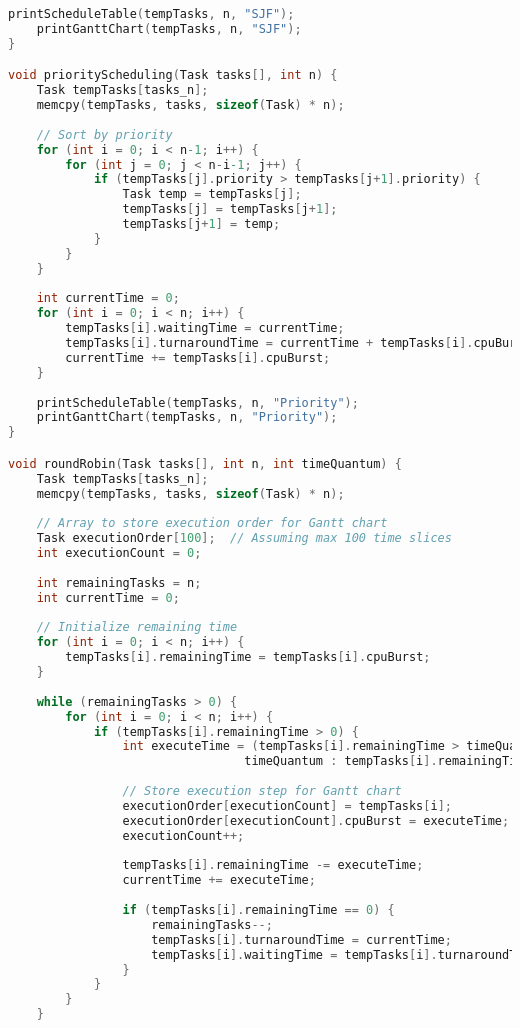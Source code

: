 \documentclass{article}
\begin{document}
\begin{lstlisting}[language=C, caption=Scheduling Code ]
    printScheduleTable(tempTasks, n, "SJF");
    printGanttChart(tempTasks, n, "SJF");
}

void priorityScheduling(Task tasks[], int n) {
    Task tempTasks[tasks_n];
    memcpy(tempTasks, tasks, sizeof(Task) * n);
    
    // Sort by priority
    for (int i = 0; i < n-1; i++) {
        for (int j = 0; j < n-i-1; j++) {
            if (tempTasks[j].priority > tempTasks[j+1].priority) {
                Task temp = tempTasks[j];
                tempTasks[j] = tempTasks[j+1];
                tempTasks[j+1] = temp;
            }
        }
    }
    
    int currentTime = 0;
    for (int i = 0; i < n; i++) {
        tempTasks[i].waitingTime = currentTime;
        tempTasks[i].turnaroundTime = currentTime + tempTasks[i].cpuBurst;
        currentTime += tempTasks[i].cpuBurst;
    }
    
    printScheduleTable(tempTasks, n, "Priority");
    printGanttChart(tempTasks, n, "Priority");
}

void roundRobin(Task tasks[], int n, int timeQuantum) {
    Task tempTasks[tasks_n];
    memcpy(tempTasks, tasks, sizeof(Task) * n);
    
    // Array to store execution order for Gantt chart
    Task executionOrder[100];  // Assuming max 100 time slices
    int executionCount = 0;
    
    int remainingTasks = n;
    int currentTime = 0;
    
    // Initialize remaining time
    for (int i = 0; i < n; i++) {
        tempTasks[i].remainingTime = tempTasks[i].cpuBurst;
    }
    
    while (remainingTasks > 0) {
        for (int i = 0; i < n; i++) {
            if (tempTasks[i].remainingTime > 0) {
                int executeTime = (tempTasks[i].remainingTime > timeQuantum) ? 
                                 timeQuantum : tempTasks[i].remainingTime;
                
                // Store execution step for Gantt chart
                executionOrder[executionCount] = tempTasks[i];
                executionOrder[executionCount].cpuBurst = executeTime;
                executionCount++;
                
                tempTasks[i].remainingTime -= executeTime;
                currentTime += executeTime;
                
                if (tempTasks[i].remainingTime == 0) {
                    remainingTasks--;
                    tempTasks[i].turnaroundTime = currentTime;
                    tempTasks[i].waitingTime = tempTasks[i].turnaroundTime - tempTasks[i].cpuBurst;
                }
            }
        }
    }
    

\end{lstlisting}
\end{document}
